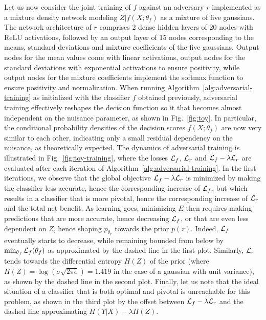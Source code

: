 \documentclass{article}
\theoremstyle{plain}
\begin{document}
Let us now consider the joint training of $f$ against an adversary $r$
implemented as a mixture density network modeling $Z|f(X;\theta_f)$ as a mixture
of five gaussians. The network architecture of $r$ comprises 2
dense hidden layers of 20 nodes with ReLU activations, followed by an
output layer of 15 nodes corresponding to the means, standard deviations and
mixture coefficients of the five gaussians. Output nodes for the mean values
come with linear activations, output nodes for the standard deviations with
exponential activations to ensure positivity, while output nodes for the mixture
coefficients implement the softmax function to ensure positivity and
normalization. When running Algorithm~\ref{alg:adversarial-training} as
initialized with the classifier $f$ obtained previously, adversarial training
effectively reshapes the decision function so it that becomes almost independent
on the nuisance parameter, as shown in Fig.~\ref{fig:toy}. In particular, the
conditional probability densities of the decision scores $f(X;\theta_f)$ are now
very similar to each other, indicating only a small residual  dependency on the
nuisance, as theoretically expected. The dynamics of adversarial training is
illustrated in Fig.~\ref{fig:toy-training}, where the losses ${\cal L}_f$,
${\cal L}_r$ and ${\cal L}_f - \lambda {\cal L}_r$ are evaluated after each
iteration of Algorithm~\ref{alg:adversarial-training}. In the first iterations,
we observe that the global objective ${\cal L}_f - \lambda {\cal L}_r$ is
minimized by making the classifier less accurate, hence the corresponding
increase of ${\cal L}_f$, but which results in a classifier that is more
pivotal, hence the corresponding increase of ${\cal L}_r$ and the total net
benefit. As learning goes, minimizing $E$ then requires making predictions that
are more accurate, hence decreasing ${\cal L}_f$, or that are even less
dependent on $Z$, hence shaping $p_{\theta_r}$ towards the prior $p(z)$. Indeed,
${\cal L}_f$ eventually starts to  decrease, while remaining bounded from below by
$\min_{\theta_f} {\cal L}_f(\theta_f)$ as approximated by the dashed line in the
first plot. Similarly,  ${\cal L}_r$ tends towards the differential entropy
$H(Z)$ of the prior (where $H(Z) = \log(\sigma \sqrt{2 \pi e}) = 1.419$ in the
case of a gaussian with unit variance), as shown by the dashed line in the
second plot. Finally, let us note that the ideal situation of a classifier that
is both optimal and pivotal is unreachable for this problem, as shown
in the third plot by the  offset between ${\cal L}_f - \lambda {\cal L}_r$ and
the dashed line approximating $H({Y|X}) - \lambda H(Z)$.
\end{document}
